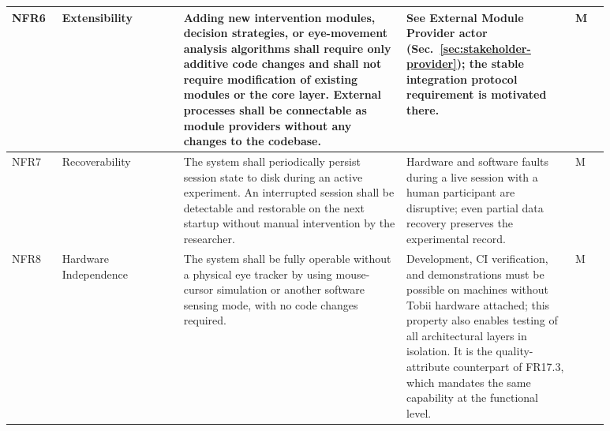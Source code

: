 \begin{longtable}{%
  p{0.07\linewidth}
  p{0.18\linewidth}
  p{0.33\linewidth}
  p{0.25\linewidth}
  p{0.05\linewidth}
}
NFR6 & Extensibility &
  Adding new intervention modules, decision strategies, or eye-movement
  analysis algorithms shall require only additive code changes and shall
  not require modification of existing modules or the core layer.
  External processes shall be connectable as module providers without
  any changes to the codebase. &
  See External Module Provider actor (Sec.~\ref{sec:stakeholder-provider});
  the stable integration protocol requirement is motivated there. & M \\
\midrule

NFR7 & Recoverability &
  The system shall periodically persist session state to disk during an
  active experiment.
  An interrupted session shall be detectable and restorable on the next
  startup without manual intervention by the researcher. &
  Hardware and software faults during a live session with a human
  participant are disruptive; even partial data recovery preserves the
  experimental record. & M \\
\midrule

NFR8 & Hardware Independence &
  The system shall be fully operable without a physical eye tracker by
  using mouse-cursor simulation or another software sensing mode, with
  no code changes required. &
  Development, CI verification, and demonstrations must be possible on
  machines without Tobii hardware attached; this property also enables
  testing of all architectural layers in isolation. It is the
  quality-attribute counterpart of FR17.3, which mandates the same
  capability at the functional level. & M \\

\end{longtable}
\endgroup
